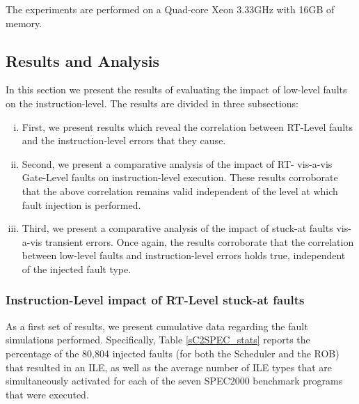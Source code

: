 \documentclass[12pt]{yalephd}
\newcommand{\snp}[1] {\noindent {\underline {#1}}}
\begin{document}
 The experiments are performed on a Quad-core Xeon 3.33GHz with 16GB of memory.


\subsection{Results and Analysis}\label{sC2Results}

In this section we present the results of evaluating the impact of low-level faults on the instruction-level. The results are divided in three subsections:

\begin{enumerate}[i)]

\item First, we present results which reveal the correlation between RT-Level faults and the instruction-level errors that they cause.

\item Second, we present a comparative analysis of the impact of RT- vis-a-vis Gate-Level faults on instruction-level execution. These results corroborate that the above correlation remains valid independent of the level at which fault injection is performed.

\item Third, we present a comparative analysis of the impact of stuck-at faults vis-a-vis transient errors. Once again, the results corroborate that the correlation between low-level faults and instruction-level errors holds true, independent of the injected fault type.

\end{enumerate}

\subsubsection{Instruction-Level impact of RT-Level stuck-at faults}\label{sC2InstImpact}
\snp{Fault Simulation Statistics:} As a first set of results, we present cumulative data regarding the fault simulations performed. Specifically, Table \ref{sC2SPEC_stats} reports the percentage of the 80,804 injected faults (for both the Scheduler and the ROB) that resulted in an ILE, as well as the average number of ILE types that are simultaneously activated for each of the seven SPEC2000 benchmark programs that were executed. 
\end{document}
